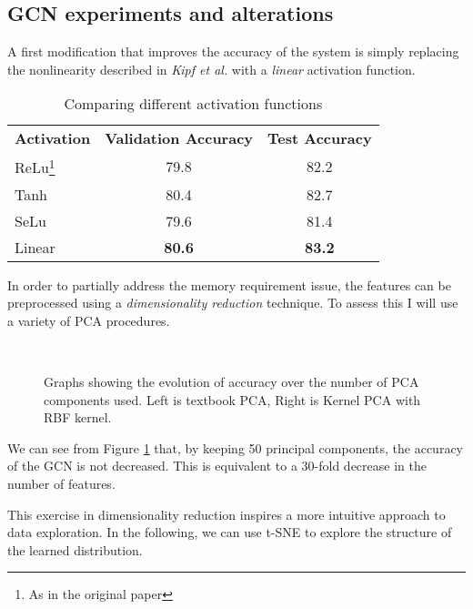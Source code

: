 \documentclass[10pt,a4]{article}
\begin{document}
    \subsection{GCN experiments and alterations}

    A first modification that improves the accuracy of the system is simply 
    replacing the nonlinearity described in \emph{Kipf et al.}\cite{kipf2016semi}
    with a \emph{linear} activation function.

    \begin{table}
        \centering
        \label{tab:activ}
        \begin{tabular}{l c c}
            \textbf{Activation} & \textbf{Validation Accuracy} & \textbf{Test Accuracy} \\
            ReLu\footnote{As in the original paper} & 79.8 & 82.2 \\
            Tanh  & 80.4 & 82.7 \\
            SeLu &  79.6 &  81.4  \\
            Linear & \textbf{80.6} &  \textbf{83.2}
        \end{tabular}
        \caption{Comparing different activation functions}
    \end{table}

    In order to partially address the memory requirement issue, the features 
    can be preprocessed using a \emph{dimensionality reduction} technique. To 
    assess this I will use a variety of PCA procedures.

    \begin{figure}
        \centering
        \mbox{
            \quad
        }
        \caption{Graphs showing the evolution of accuracy over the number of PCA 
        components used. Left is textbook PCA, Right is Kernel PCA with RBF kernel.}
        \label{fig:pca}
    \end{figure}
    We can see from Figure \ref{fig:pca} that, by keeping 50 principal components, the accuracy
    of the GCN is not decreased. This is equivalent to a 30-fold decrease in 
    the number of features. 

    This exercise in dimensionality reduction inspires a more intuitive approach 
    to data exploration. In the following, we can use t-SNE \cite{van2008visualizing}
    to explore the structure of the learned distribution.
\end{document}
